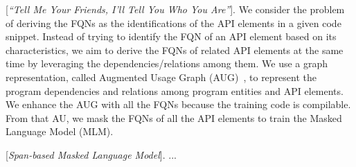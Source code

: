 \vspace{2pt}
 [{\em ``Tell Me Your Friends, I'll Tell You
    Who You Are''}]. We consider the problem of deriving the FQNs as
the identifications of the API elements in a given code snippet.
Instead of trying to identify the FQN of an API element based on its
characteristics, we aim to derive the FQNs of related API elements at
the same time by leveraging the dependencies/relations among them.  We
use a graph representation, called Augmented Usage Graph
(AUG)~\cite{msr19}, to represent the program dependencies and
relations among program entities and API elements. We enhance the AUG
with all the FQNs because the training code is compilable. From that
AU, we mask the FQNs of all the API elements to train the Masked
Language Model (MLM).

\vspace{2pt}
 [{\em Span-based Masked Language Model}]. ...
  

